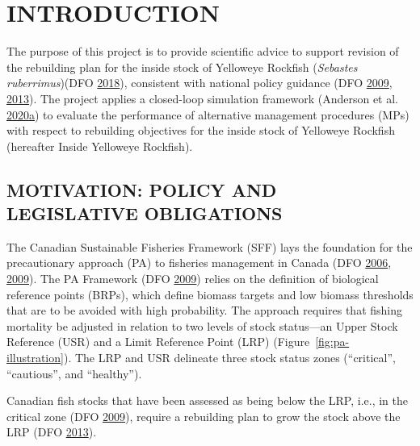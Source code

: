 \documentclass[11pt]{book}
\begin{document}
\frontmatter

\clearpage

\hypertarget{sec:introduction}{%
\section{INTRODUCTION}\label{sec:introduction}}

The purpose of this project is to provide scientific advice to support revision of the rebuilding plan for the inside stock of Yelloweye Rockfish (\emph{Sebastes ruberrimus})(DFO \protect\hyperlink{ref-ifmp2018}{2018}), consistent with national policy guidance (DFO \protect\hyperlink{ref-dfo2009}{2009}, \protect\hyperlink{ref-dfo2013}{2013}). The project applies a closed-loop simulation framework (Anderson et al. \protect\hyperlink{ref-anderson2020gfmp}{2020}\protect\hyperlink{ref-anderson2020gfmp}{a}) to evaluate the performance of alternative management procedures (MPs) with respect to rebuilding objectives for the inside stock of Yelloweye Rockfish (hereafter Inside Yelloweye Rockfish).

\hypertarget{sec:introduction-motivation}{%
\subsection{MOTIVATION: POLICY AND LEGISLATIVE OBLIGATIONS}\label{sec:introduction-motivation}}

The Canadian Sustainable Fisheries Framework (SFF) lays the foundation for the precautionary approach (PA) to fisheries management in Canada (DFO \protect\hyperlink{ref-dfo2006}{2006}, \protect\hyperlink{ref-dfo2009}{2009}). The PA Framework (DFO \protect\hyperlink{ref-dfo2009}{2009}) relies on the definition of biological reference points (BRPs), which define biomass targets and low biomass thresholds that are to be avoided with high probability. The approach requires that fishing mortality be adjusted in relation to two levels of stock status---an Upper Stock Reference (USR) and a Limit Reference Point (LRP) (Figure~\ref{fig:pa-illustration}). The LRP and USR delineate three stock status zones (``critical'', ``cautious'', and ``healthy'').

Canadian fish stocks that have been assessed as being below the LRP, i.e., in the critical zone (DFO \protect\hyperlink{ref-dfo2009}{2009}), require a rebuilding plan to grow the stock above the LRP (DFO \protect\hyperlink{ref-dfo2013}{2013}).
\end{document}

